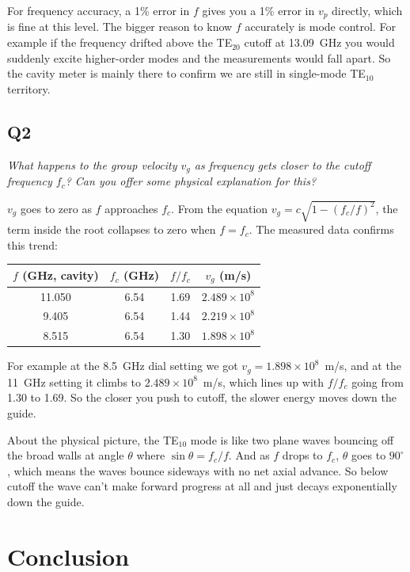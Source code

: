 \documentclass[11pt,letterpaper]{article}
\begin{document}
For frequency accuracy, a 1\% error in $f$ gives you a 1\% error in $v_p$ directly, which is fine at this level. The bigger reason to know $f$ accurately is mode control. For example if the frequency drifted above the TE$_{20}$ cutoff at 13.09~GHz you would suddenly excite higher-order modes and the measurements would fall apart. So the cavity meter is mainly there to confirm we are still in single-mode TE$_{10}$ territory.

\subsection*{Q2}
\textit{What happens to the group velocity $v_g$ as frequency gets closer to the cutoff frequency $f_c$? Can you offer some physical explanation for this?}

$v_g$ goes to zero as $f$ approaches $f_c$. From the equation $v_g = c\sqrt{1 - (f_c/f)^2}$, the term inside the root collapses to zero when $f = f_c$. The measured data confirms this trend:

\begin{center}
\begin{tabular}{cccc}
\toprule
$f$ (GHz, cavity) & $f_c$ (GHz) & $f/f_c$ & $v_g$ (m/s) \\
\midrule
11.050 & 6.54 & 1.69 & $2.489\times10^{8}$ \\
9.405  & 6.54 & 1.44 & $2.219\times10^{8}$ \\
8.515  & 6.54 & 1.30 & $1.898\times10^{8}$ \\
\bottomrule
\end{tabular}
\end{center}

For example at the 8.5~GHz dial setting we got $v_g = 1.898\times10^{8}$~m/s, and at the 11~GHz setting it climbs to $2.489\times10^{8}$~m/s, which lines up with $f/f_c$ going from 1.30 to 1.69. So the closer you push to cutoff, the slower energy moves down the guide.

About the physical picture, the TE$_{10}$ mode is like two plane waves bouncing off the broad walls at angle $\theta$ where $\sin\theta = f_c/f$. And as $f$ drops to $f_c$, $\theta$ goes to $90^\circ$, which means the waves bounce sideways with no net axial advance. So below cutoff the wave can't make forward progress at all and just decays exponentially down the guide.

\section{Conclusion}
\end{document}
